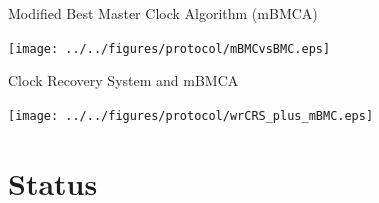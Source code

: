 \documentclass[compress,red]{beamer}
\begin{document}
\begin{frame}{Modified Best Master Clock Algorithm (mBMCA)}

    \begin{center}
    \texttt{[image: ../../figures/protocol/mBMCvsBMC.eps]}
    \end{center}


\end{frame}
\begin{frame}{Clock Recovery System and mBMCA}


  \begin{center}
  \texttt{[image: ../../figures/protocol/wrCRS\_plus\_mBMC.eps]}
  \end{center}

\end{frame}
\section{Status}
\end{document}
